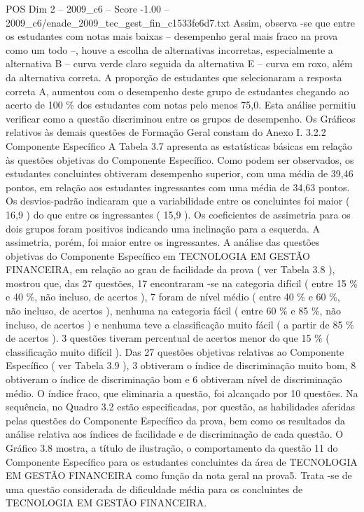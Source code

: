 \begin{textsample}{POS Dim 2 – 2009\_c6 – Score -1.00 – 2009\_c6/enade\_2009\_tec\_gest\_fin\_c1533fe6d7.txt}
Assim, observa -se que entre os estudantes com notas mais baixas – desempenho geral mais fraco na prova como um todo –, houve a escolha de alternativas incorretas, especialmente a alternativa B – curva verde claro seguida da alternativa E – curva em roxo, além da alternativa correta.
A proporção de estudantes que selecionaram a resposta correta A, aumentou com o desempenho deste grupo de estudantes chegando ao acerto de 100 \% dos estudantes com notas pelo menos 75,0.
Esta análise permitiu verificar como a questão discriminou entre os grupos de desempenho.
Os Gráficos relativos às demais questões de Formação Geral constam do Anexo I. 3.2.2 Componente Específico A Tabela 3.7 apresenta as estatísticas básicas em relação às questões objetivas do Componente Específico.
Como podem ser observados, os estudantes concluintes obtiveram desempenho superior, com uma média de 39,46 pontos, em relação aos estudantes ingressantes com uma média de 34,63 pontos.
Os desvios-padrão indicaram que a variabilidade entre os concluintes foi maior ( 16,9 ) do que entre os ingressantes ( 15,9 ).
Os coeficientes de assimetria para os dois grupos foram positivos indicando uma inclinação para a esquerda.
A assimetria, porém, foi maior entre os ingressantes.
A análise das questões objetivas do Componente Específico em TECNOLOGIA EM GESTÃO FINANCEIRA, em relação ao grau de facilidade da prova ( ver Tabela 3.8 ), mostrou que, das 27 questões, 17 encontraram -se na categoria difícil ( entre 15 \% e 40 \%, não incluso, de acertos ), 7 foram de nível médio ( entre 40 \% e 60 \%, não incluso, de acertos ), nenhuma na categoria fácil ( entre 60 \% e 85 \%, não incluso, de acertos ) e nenhuma teve a classificação muito fácil ( a partir de 85 \% de acertos ). 3 questões tiveram percentual de acertos menor do que 15 \% ( classificação muito difícil ).
Das 27 questões objetivas relativas ao Componente Específico ( ver Tabela 3.9 ), 3 obtiveram o índice de discriminação muito bom, 8 obtiveram o índice de discriminação bom e 6 obtiveram nível de discriminação médio.
O índice fraco, que eliminaria a questão, foi alcançado por 10 questões.
Na sequência, no Quadro 3.2 estão especificadas, por questão, as habilidades aferidas pelas questões do Componente Específico da prova, bem como os resultados da análise relativa aos índices de facilidade e de discriminação de cada questão.
O Gráfico 3.8 mostra, a título de ilustração, o comportamento da questão 11 do Componente Específico para os estudantes concluintes da área de TECNOLOGIA EM GESTÃO FINANCEIRA como função da nota geral na prova5.
Trata -se de uma questão considerada de dificuldade média para os concluintes de TECNOLOGIA EM GESTÃO FINANCEIRA.

\end{textsample}
